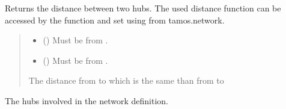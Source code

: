 \documentclass[letterpaper,10pt,english]{sphinxmanual}
\begin{document}
\begin{fulllineitems}
\begin{fulllineitems}
\label{\detokenize{generated/tamos.network.ThermalNetwork:tamos.network.ThermalNetwork.get_distance}}
\pysigstartsignatures
{}
\pysigstopsignatures
\sphinxAtStartPar
Returns the distance between two hubs.
The used distance function can be accessed by the  function
and set using  from tamos.network.
\begin{quote}\begin{description}
\begin{itemize}
\item {} 
\sphinxAtStartPar
{} ({\hyperref[\detokenize{generated/tamos.Hub:tamos.Hub}]{}}) \textendash{} Must be from .

\item {} 
\sphinxAtStartPar
{} ({\hyperref[\detokenize{generated/tamos.Hub:tamos.Hub}]{}}) \textendash{} Must be from .

\end{itemize}

\sphinxAtStartPar
The distance from  to  which is the same than from  to 

\end{description}\end{quote}

\end{fulllineitems}


\begin{fulllineitems}
\label{\detokenize{generated/tamos.network.ThermalNetwork:tamos.network.ThermalNetwork.hubs}}
\pysigstartsignatures
{}
\pysigstopsignatures
\sphinxAtStartPar
The hubs involved in the network definition.


\end{fulllineitems}
\end{fulllineitems}
\end{document}
